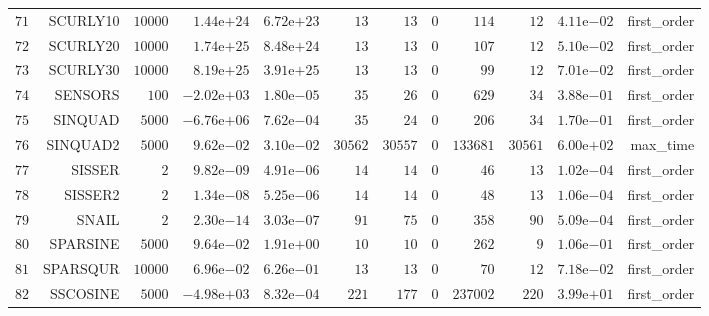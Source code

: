 \begin{longtable}{rrrrrrrrrrrr}
  \(    71\) & SCURLY10 & \( 10000\) & \( 1.44\)e\(+24\) & \( 6.72\)e\(+23\) & \(    13\) & \(    13\) & \(     0\) & \(   114\) & \(    12\) & \( 4.11\)e\(-02\) & first\_order \\
  \(    72\) & SCURLY20 & \( 10000\) & \( 1.74\)e\(+25\) & \( 8.48\)e\(+24\) & \(    13\) & \(    13\) & \(     0\) & \(   107\) & \(    12\) & \( 5.10\)e\(-02\) & first\_order \\
  \(    73\) & SCURLY30 & \( 10000\) & \( 8.19\)e\(+25\) & \( 3.91\)e\(+25\) & \(    13\) & \(    13\) & \(     0\) & \(    99\) & \(    12\) & \( 7.01\)e\(-02\) & first\_order \\
  \(    74\) & SENSORS & \(   100\) & \(-2.02\)e\(+03\) & \( 1.80\)e\(-05\) & \(    35\) & \(    26\) & \(     0\) & \(   629\) & \(    34\) & \( 3.88\)e\(-01\) & first\_order \\
  \(    75\) & SINQUAD & \(  5000\) & \(-6.76\)e\(+06\) & \( 7.62\)e\(-04\) & \(    35\) & \(    24\) & \(     0\) & \(   206\) & \(    34\) & \( 1.70\)e\(-01\) & first\_order \\
  \(    76\) & SINQUAD2 & \(  5000\) & \( 9.62\)e\(-02\) & \( 3.10\)e\(-02\) & \( 30562\) & \( 30557\) & \(     0\) & \(133681\) & \( 30561\) & \( 6.00\)e\(+02\) & max\_time \\
  \(    77\) & SISSER & \(     2\) & \( 9.82\)e\(-09\) & \( 4.91\)e\(-06\) & \(    14\) & \(    14\) & \(     0\) & \(    46\) & \(    13\) & \( 1.02\)e\(-04\) & first\_order \\
  \(    78\) & SISSER2 & \(     2\) & \( 1.34\)e\(-08\) & \( 5.25\)e\(-06\) & \(    14\) & \(    14\) & \(     0\) & \(    48\) & \(    13\) & \( 1.06\)e\(-04\) & first\_order \\
  \(    79\) & SNAIL & \(     2\) & \( 2.30\)e\(-14\) & \( 3.03\)e\(-07\) & \(    91\) & \(    75\) & \(     0\) & \(   358\) & \(    90\) & \( 5.09\)e\(-04\) & first\_order \\
  \(    80\) & SPARSINE & \(  5000\) & \( 9.64\)e\(-02\) & \( 1.91\)e\(+00\) & \(    10\) & \(    10\) & \(     0\) & \(   262\) & \(     9\) & \( 1.06\)e\(-01\) & first\_order \\
  \(    81\) & SPARSQUR & \( 10000\) & \( 6.96\)e\(-02\) & \( 6.26\)e\(-01\) & \(    13\) & \(    13\) & \(     0\) & \(    70\) & \(    12\) & \( 7.18\)e\(-02\) & first\_order \\
  \(    82\) & SSCOSINE & \(  5000\) & \(-4.98\)e\(+03\) & \( 8.32\)e\(-04\) & \(   221\) & \(   177\) & \(     0\) & \(237002\) & \(   220\) & \( 3.99\)e\(+01\) & first\_order \\

\end{longtable}
